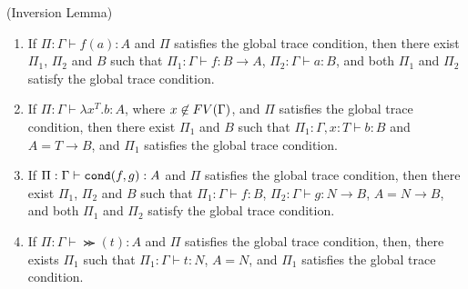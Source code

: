 \begin{lemma}(Inversion Lemma)\label{lem:inversion}
  \begin{enumerate}
  \item\label{lem:inversion1}
    If $\Pi:\Gamma\vdash f(a):A$ and $\Pi$ satisfies the global trace condition, then
    there exist $\Pi_1$, $\Pi_2$ and $B$ such that
    $\Pi_1:\Gamma\vdash f:B\to A$, $\Pi_2:\Gamma\vdash a:B$,
    and both $\Pi_1$ and $\Pi_2$ satisfy the global trace condition. 
  \item\label{lem:inversion2}
    If $\Pi:\Gamma\vdash \lambda x^T.b:A$, where $x\not\in{{\relax FV}}(\Gamma)$,
    and $\Pi$ satisfies the global trace condition, then
    there exist $\Pi_1$ and $B$ such that
    $\Pi_1:\Gamma,x:T\vdash b:B$ and $A = T\to B$,
    and $\Pi_1$ satisfies the global trace condition. 
  \item\label{lem:inversion3}
    If $\Pi:\Gamma\vdash {\tt cond}(f,g):A$ and $\Pi$ satisfies the global trace condition, then
    there exist $\Pi_1$, $\Pi_2$ and $B$ such that
    $\Pi_1:\Gamma \vdash f:B$, $\Pi_2:\Gamma \vdash g:N\to B$, $A = N\to B$,
    and both $\Pi_1$ and $\Pi_2$ satisfy the global trace condition. 
  \item\label{lem:inversion4}
    If $\Pi:\Gamma\vdash \Succ(t):A$ and $\Pi$ satisfies the global trace condition, 
    then, there exists $\Pi_1$ such that $\Pi_1:\Gamma \vdash t:N$, $A=N$, 
 and $\Pi_1$ satisfies the global trace condition. 
  \end{enumerate}
\end{lemma}

%
%
%  
%

